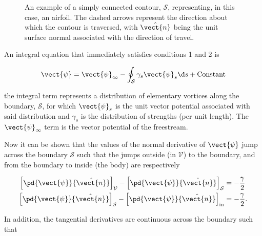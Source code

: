 \begin{figure}[h!]
    \centering
        
        \caption{An example of a simply connected contour, \(\mathcal{S}\), representing, in this case, an airfoil. The dashed arrows represent the direction about which the contour is traversed, with \(\hat{\vect{n}}\) being the unit surface normal associated with the direction of travel.}
    \label{fig:simplyconnectedairfoil}
\end{figure}

\noindent An integral equation that immediately satisfies conditions 1 and 2 is

\begin{equation}
    \label{eqn:bie1}
    \vect{\psi} = \vect{\psi}_\infty - \oint_\mathcal{S} \gamma_s \vect{\psi}_s \d s + \text{Constant}
\end{equation}

\where the integral term represents a distribution of elementary vortices along the boundary, \(\mathcal{S}\), for which \(\vect{\psi}_s\) is the unit vector potential associated with said distribution and \(\gamma_s\) is the distribution of strengths (per unit length).
%
The \(\vect{\psi}_\infty\) term is the vector potential of the freestream.


Now it can be shown that the values of the normal derivative of \(\vect{\psi}\) jump across the boundary \(\mathcal{S}\) such that the jumps outside (in \(\mathcal{V}\)) to the boundary, and from the boundary to inside (the body) are respectively

\begin{subequations}
\label{eqn:jumpdn}
\begin{align}
    \left[\pd{\vect{\psi}}{\hat{\vect{n}}}\right]_\mathcal{V} - \left[\pd{\vect{\psi}}{\hat{\vect{n}}}\right]_\mathcal{S} &= -\frac{\gamma}{2} \\
    \left[\pd{\vect{\psi}}{\hat{\vect{n}}}\right]_\mathcal{S} - \left[\pd{\vect{\psi}}{\hat{\vect{n}}}\right]_\text{in} &= -\frac{\gamma}{2}.
\end{align}
\end{subequations}

\noindent In addition, the tangential derivatives are continuous across the boundary such that

